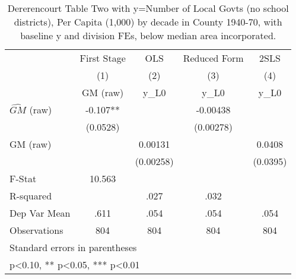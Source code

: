 \begin{table}[htbp]\centering
\def\sym#1{\ifmmode^{#1}\else\(^{#1}\)\fi}
\caption{Dererencourt Table Two with y=Number of Local Govts (no school districts), Per Capita (1,000) by decade in County 1940-70, with baseline y and division FEs, below median area incorporated.}
\begin{tabular}{l*{4}{c}}
\toprule
                    & First Stage   &         OLS   &Reduced Form   &        2SLS   \\
                    &\multicolumn{1}{c}{(1)}&\multicolumn{1}{c}{(2)}&\multicolumn{1}{c}{(3)}&\multicolumn{1}{c}{(4)}\\
                    &\multicolumn{1}{c}{GM  (raw)}&\multicolumn{1}{c}{y\_L0}&\multicolumn{1}{c}{y\_L0}&\multicolumn{1}{c}{y\_L0}\\
\midrule
$\hat{GM}$ (raw)    &      -0.107** &               &    -0.00438   &               \\
                    &    (0.0528)   &               &   (0.00278)   &               \\
\addlinespace
GM  (raw)           &               &     0.00131   &               &      0.0408   \\
                    &               &   (0.00258)   &               &    (0.0395)   \\
\midrule
F-Stat              &      10.563   &               &               &               \\
R-squared           &               &        .027   &        .032   &               \\
Dep Var Mean        &        .611   &        .054   &        .054   &        .054   \\
Observations        &         804   &         804   &         804   &         804   \\
\bottomrule
\multicolumn{5}{l}{\footnotesize Standard errors in parentheses}\\
\multicolumn{5}{l}{\footnotesize * p<0.10, ** p<0.05, *** p<0.01}\\
\end{tabular}
\end{table}
